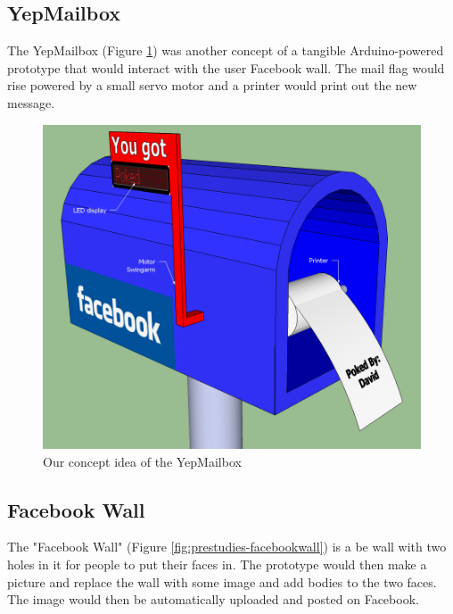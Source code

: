 \newpage

\subsection{YepMailbox}
The YepMailbox (Figure \ref{fig:prestudies-YepMailbox}) was another concept of a tangible Arduino-powered prototype 
that would interact with the user Facebook wall. The mail flag would rise powered by a small servo motor and a printer 
would print out the new message.

\begin{figure}[h!]
\centering \includegraphics[scale=0.4]{img/prestudies-YepMailbox} \caption{Our concept idea of the YepMailbox}

\label{fig:prestudies-YepMailbox}
\end{figure}

\newpage

\subsection{Facebook Wall}
The "Facebook Wall" (Figure \ref{fig:prestudies-facebookwall}) is a be wall with two holes in it for people to put their faces in. 
The prototype would then make a picture and replace the wall with some image and add bodies to the two faces. The image 
would then be automatically uploaded and posted on Facebook.

